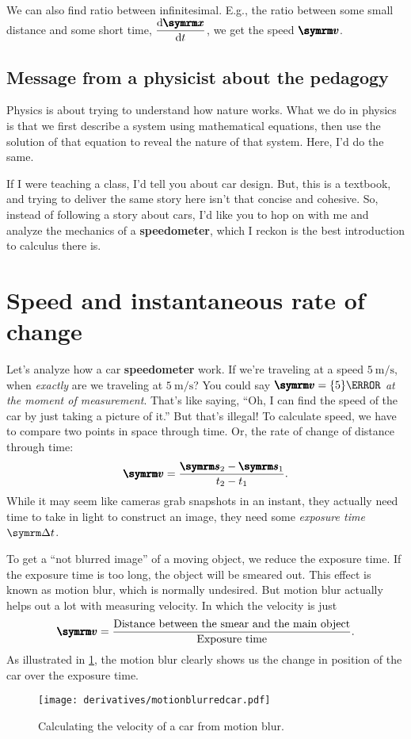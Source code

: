 We can also find ratio between infinitesimal. E.g., the ratio between some small distance and some short time, $\displaystyle\dv{\vv{x}}{t}$, we get the speed $\vv{v}$.

\subsection{Message from a physicist about the pedagogy}

Physics is about trying to understand how nature works. What we do in physics is that we first describe a system using mathematical equations, then use the solution of that equation to reveal the nature of that system. Here, I'd do the same.

If I were teaching a class, I'd tell you about car design. But, this is a textbook, and trying to deliver the same story here isn't that concise and cohesive. So, instead of following a story about cars, I'd like you to hop on with me and analyze the mechanics of a \textbf{speedometer}, which I reckon is the best introduction to calculus there is.

\section{Speed and instantaneous rate of change}
\label{sec:speedandinstantaneousrateofchange}

Let's analyze how a car \textbf{speedometer} work. If we're traveling at a speed $\qty{5}{\meter\per\second}$, when \emph{exactly} are we traveling at $\qty{5}{\meter\per\second}$? You could say $\vv{v} = \qty{5}{\meter}$ \emph{at the moment of measurement}. That's like saying, ``Oh, I can find the speed of the car by just taking a picture of it.'' But that's illegal! To calculate speed, we have to compare two points in space through time. Or, the rate of change of distance through time:
\begin{equation}
    \vv{v} = \frac{\vv{s}_2 - \vv{s}_1}{t_2 - t_1}. \label{eq:averagevelocity}
\end{equation}
While it may seem like cameras grab snapshots in an instant, they actually need time to take in light to construct an image, they need some \emph{exposure time} $\Dd{t}$.

To get a ``not blurred image'' of a moving object, we reduce the exposure time. If the exposure time is too long, the object will be smeared out. This effect is known as motion blur, which is normally undesired. But motion blur actually helps out a lot with measuring velocity. In which the velocity is just 
\begin{equation}
    \vv{v} = \frac{\textrm{Distance between the smear and the main object}}{\textrm{Exposure time}}.
\end{equation}
As illustrated in \cref{fig:car-motion-blur}, the motion blur clearly shows us the change in position of the car over the exposure time.
\begin{figure}[ht]
   \centering
   \texttt{[image: derivatives/motionblurredcar.pdf]} 
   \caption{Calculating the velocity of a car from motion blur.}
   \label{fig:car-motion-blur}
\end{figure}

